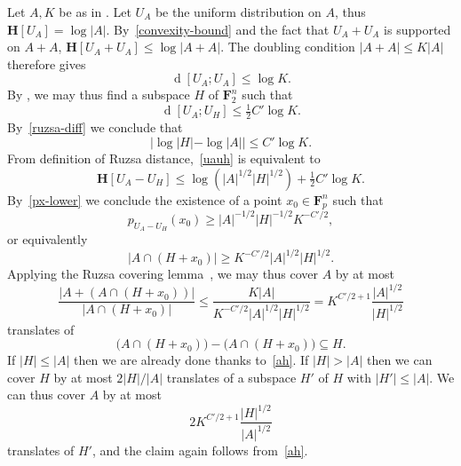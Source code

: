 \documentclass[12pt,reqno,tbtags]{amsart}
\theoremstyle{definition}
\theoremstyle{remark}
\renewcommand{\leq}{\leqslant}
\renewcommand{\geq}{\geqslant}
\def\F{\mathbf{F}}
\newcommand{\ent}[1]{\mathbf{H}[#1]}
\newcommand{\dist}[2]{{\operatorname{d}[#1;#2]}} %
\numberwithin{equation}{section}
\begin{document}
Let $A,K$ be as in .  Let $U_A$ be the uniform distribution on $A$, thus $\ent{U_A} = \log |A|$. By~\eqref{convexity-bound} and the fact that $U_A + U_A$ is supported on $A + A$, $\ent{U_A + U_A} \leq \log|A+A|$. The doubling condition $|A+A| \leq K|A|$ therefore gives
\[ \dist{U_A}{U_A} \leq \log K.\]
By , we may thus find a subspace $H$ of $\F_2^n$ such that
\begin{equation}\label{uauh} \dist{U_A}{U_H} \leq \tfrac{1}{2} C' \log K.\end{equation}
By~\eqref{ruzsa-diff} we conclude that
\begin{equation}\label{ah}
  |\log |H| - \log |A|| \leq C' \log K.
\end{equation}
From definition of Ruzsa distance,~\eqref{uauh} is equivalent to
\[ \ent{U_A - U_H} \leq \log( |A|^{1/2} |H|^{1/2}) + \tfrac{1}{2} C' \log K.\]
By~\eqref{px-lower} we conclude the existence of a point $x_0 \in \F_p^n$ such that
\[ p_{U_A-U_H}(x_0) \geq |A|^{-1/2} |H|^{-1/2} K^{-C'/2},\]
or equivalently
\[ |A \cap (H + x_0)| \geq K^{-C'/2} |A|^{1/2} |H|^{1/2}.\]
Applying the Ruzsa covering lemma~\cite[Lemma 2.14]{tao-vu}, we may thus cover $A$ by at most
\[ \frac{|A + (A \cap (H+x_0))|}{|A \cap (H + x_0)|} \leq \frac{K|A|}{K^{-C'/2} |A|^{1/2} |H|^{1/2}} = K^{C'/2+1} \frac{|A|^{1/2}}{|H|^{1/2}}\]
translates of
\[ \bigl(A \cap (H + x_0)\bigr) - \bigl(A \cap (H + x_0)\bigr) \subseteq H.\]
If $|H| \leq |A|$ then we are already done thanks to~\eqref{ah}.  If $|H| > |A|$ then we can cover $H$ by at most $2 |H|/|A|$ translates of a subspace $H'$ of $H$ with $|H'| \leq |A|$.  We can thus cover $A$ by at most
\[ 2K^{C'/2+1} \frac{|H|^{1/2}}{|A|^{1/2}}\]
translates of $H'$, and the claim again follows from~\eqref{ah}.
\end{document}
